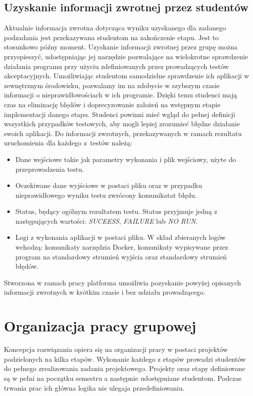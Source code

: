 \vfill

\subsection{Uzyskanie informacji zwrotnej przez studentów}

Aktualnie informacja zwrotna dotycząca wyniku uzyskanego dla zadanego podzadania jest przekazywana studentom na zakończenie etapu.
Jest to stosunkowo późny moment.
Uzyskanie informacji zwrotnej przez grupę można przyspieszyć, udostępniając jej narzędzie pozwalające na wielokrotne sprawdzenie działania programu przy użyciu zdefiniowanych przez prowadzących testów akceptacyjnych.
Umożliwiając studentom samodzielne sprawdzenie ich aplikacji w zewnętrznym środowisku, pozwalamy im na zdobycie w szybszym czasie informacji o nieprawidłowościach w ich programie.
Dzięki temu studenci mają czas na eliminację błędów i doprecyzowanie założeń na wstępnym etapie implementacji danego etapu.
Studenci powinni mieć wgląd do pełnej definicji wszystkich przypadków testowych, aby mogli lepiej zrozumieć błędne działanie swoich aplikacji.
Do informacji zwrotnych, przekazywanych w ramach rezultatu uruchomienia dla każdego z~testów należą:
\begin{itemize}
    \item Dane wejściowe takie jak parametry wykonania i plik wejściowy, użyte do przeprowadzenia testu.
    \item Oczekiwane dane wyjściowe w postaci pliku oraz w przypadku nieprawidłowego wyniku testu zwrócony komunikatat błędu.
    \item Status, będący ogólnym rezultatem testu.
    Status przyjmuje jedną z następujących wartości: \textit{SUCEESS}, \textit{FAILURE} lub \textit{NO RUN}.
    \item Logi z wykonania aplikacji w postaci pliku.
    W skład zbieranych logów wchodzą: komunikaty narzędzia Docker, komunikaty wypisywane przez program na standardowy strumień wyjścia oraz standardowy strumień błędów.
\end{itemize}

Stworzona w ramach pracy platforma umożliwia pozyskanie powyżej opisanych informacji zwrotnych w krótkim czasie i bez udziału prowadzącego.

\section{Organizacja pracy grupowej}

Koncepcja rozwiązania opiera się na organizacji pracy w postaci projektów podzielonych na kilka etapów.
Wykonanie każdego z etapów prowadzi studentów do pełnego zrealizowania zadania projektowego.
Projekty oraz etapy definiowane są w pełni na początku semestru a następnie udostępniane studentom.
Podczas trwania prac ich główna logika nie ulegaja przedefiniowaniu.

